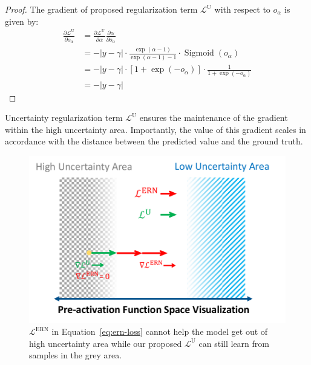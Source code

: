 \begin{proof}
The gradient of proposed regularization term $\mathcal{L}^{\mathrm{U}}$ with respect to $o_{\alpha}$ is given by:
\begin{equation}
\begin{aligned}
\frac{\partial \mathcal{L}^{\mathrm{U}}}{\partial o_\alpha} &= \frac{\partial \mathcal{L}^{\mathrm{U}}}{\partial \alpha} \frac{\partial \alpha}{\partial o_{\alpha}}     \\
&=-| y-\gamma | \cdot \frac{\exp (\alpha-1)}{\exp (\alpha-1)-1} \cdot \operatorname{Sigmoid}\left(o_\alpha\right) \\
&=-| y-\gamma | \cdot \left[1+\exp \left(-o_\alpha\right)\right] \cdot \frac{1}{1+\exp \left(-o_\alpha\right)} \\
&=-| y-\gamma |
\end{aligned}
\end{equation}
\end{proof}
Uncertainty regularization term $\mathcal{L}^{\mathrm{U}}$ ensures the maintenance of the gradient within the high uncertainty area. Importantly, the value of this gradient scales in accordance with the distance between the predicted value and the ground truth.

\begin{figure}
\centering
\includegraphics[width=0.9\columnwidth]{Uncertainty} %
\caption{$\mathcal{L}^{\mathrm{ERN}}$ in Equation~\eqref{eq:ern-loss} cannot help the model get out of high uncertainty area while our proposed $\mathcal{L}^{\mathrm{U}}$ can still learn from samples in the grey area.}
\label{uncertainty_visualization}
\end{figure}



